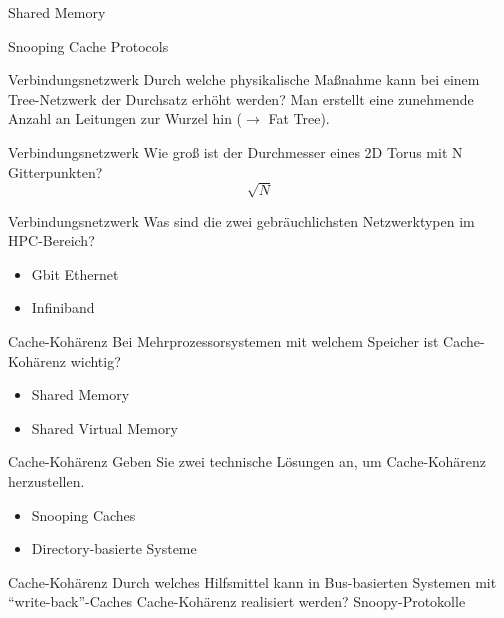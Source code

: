 \begin{defi}{Shared Memory}
\begin{defi}{Snooping Cache Protocols}
        \begin{aufgabe}{Verbindungsnetzwerk}
            Durch welche physikalische Maßnahme kann bei einem Tree-Netzwerk der Durchsatz erhöht werden?
            \tcblower
            Man erstellt eine zunehmende Anzahl an Leitungen zur Wurzel hin ($\to$ Fat Tree).
        \end{aufgabe}

        \begin{aufgabe}{Verbindungsnetzwerk}
            Wie groß ist der Durchmesser eines 2D Torus mit N Gitterpunkten?
            \tcblower
            $$\sqrt{N}$$
        \end{aufgabe}

        \begin{aufgabe}{Verbindungsnetzwerk}
            Was sind die zwei gebräuchlichsten Netzwerktypen im HPC-Bereich?
            \tcblower
            \begin{itemize}
                \item Gbit Ethernet
                \item Infiniband
            \end{itemize}
        \end{aufgabe}

        \begin{aufgabe}{Cache-Kohärenz}
            Bei Mehrprozessorsystemen mit welchem Speicher ist Cache-Kohärenz wichtig?
            \tcblower
            \begin{itemize}
                \item Shared Memory
                \item Shared Virtual Memory
            \end{itemize}
        \end{aufgabe}

        \begin{aufgabe}{Cache-Kohärenz}
            Geben Sie zwei technische Lösungen an, um Cache-Kohärenz herzustellen.
            \tcblower
            \begin{itemize}
                \item Snooping Caches
                \item Directory-basierte Systeme
            \end{itemize}
        \end{aufgabe}

        \begin{aufgabe}{Cache-Kohärenz}
            Durch welches Hilfsmittel kann in Bus-basierten Systemen mit \enquote{write-back}-Caches Cache-Kohärenz realisiert werden?
            \tcblower
            Snoopy-Protokolle
        \end{aufgabe}


\end{defi}
\end{defi}
